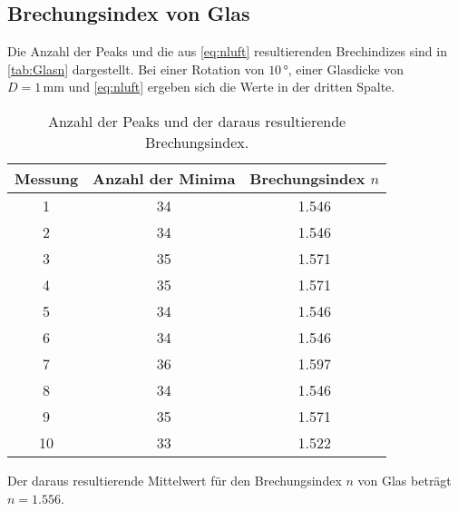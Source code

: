 \subsection{Brechungsindex von Glas}
\label{sec:AuswGlas}
Die Anzahl der Peaks und die aus \autoref{eq:nluft} resultierenden Brechindizes sind in \autoref{tab:Glasn} dargestellt. Bei einer Rotation von $10\, °$, einer Glasdicke von $D=1\, \unit{\milli \meter}$ und \autoref{eq:nluft} ergeben sich die Werte in der dritten Spalte.
\begin{table}
    \centering
    \caption{Anzahl der Peaks und der daraus resultierende Brechungsindex.}
    \begin{tabular}{c c c}
        \toprule
        Messung & Anzahl der Minima & Brechungsindex $n$ \\
        \midrule
             1 & 34 & 1.546\\
             2 & 34 & 1.546\\
             3 & 35 & 1.571\\
             4 & 35 & 1.571\\
             5 & 34 & 1.546\\
             6 & 34 & 1.546\\
             7 & 36 & 1.597\\
             8 & 34 & 1.546\\
             9 & 35 & 1.571\\
            10 & 33 & 1.522\\
            \bottomrule
    \end{tabular}
    \label{tab:Glasn}
\end{table}
Der daraus resultierende Mittelwert für den Brechungsindex $n$ von Glas beträgt $n=1.556$.


